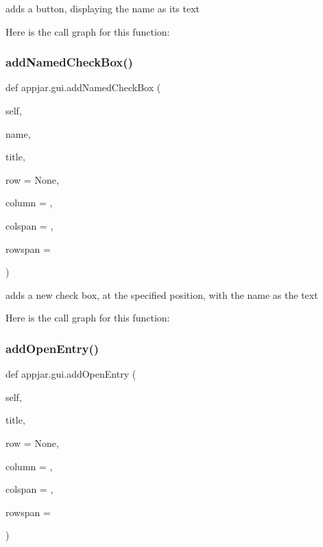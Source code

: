 \begin{DoxyVerb}adds a button, displaying the name as its text \end{DoxyVerb}
 Here is the call graph for this function\+:
\mbox{\label{classappjar_1_1gui_ac86a2fb6536349361c989bb826df2a57}} 
\subsubsection{\texorpdfstring{add\+Named\+Check\+Box()}{addNamedCheckBox()}}
{\footnotesize\ttfamily def appjar.\+gui.\+add\+Named\+Check\+Box (\begin{DoxyParamCaption}\item[{}]{self,  }\item[{}]{name,  }\item[{}]{title,  }\item[{}]{row = {\ttfamily None},  }\item[{}]{column = {},  }\item[{}]{colspan = {},  }\item[{}]{rowspan = {} }\end{DoxyParamCaption})}

\begin{DoxyVerb}adds a new check box, at the specified position, with the name as the text \end{DoxyVerb}
 Here is the call graph for this function\+:
\mbox{\label{classappjar_1_1gui_af900fd83f5bfa65d4a96b68dcad976e8}} 
\subsubsection{\texorpdfstring{add\+Open\+Entry()}{addOpenEntry()}}
{\footnotesize\ttfamily def appjar.\+gui.\+add\+Open\+Entry (\begin{DoxyParamCaption}\item[{}]{self,  }\item[{}]{title,  }\item[{}]{row = {\ttfamily None},  }\item[{}]{column = {},  }\item[{}]{colspan = {},  }\item[{}]{rowspan = {} }\end{DoxyParamCaption})}

